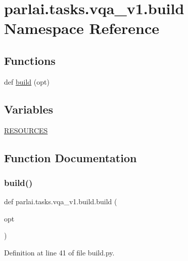 \hypertarget{namespaceparlai_1_1tasks_1_1vqa__v1_1_1build}{}\section{parlai.\+tasks.\+vqa\+\_\+v1.\+build Namespace Reference}
\label{namespaceparlai_1_1tasks_1_1vqa__v1_1_1build}
\subsection*{Functions}
\begin{DoxyCompactItemize}
\item 
def \hyperlink{namespaceparlai_1_1tasks_1_1vqa__v1_1_1build_a183cd229fa87a5dacae8b5424819df18}{build} (opt)
\end{DoxyCompactItemize}
\subsection*{Variables}
\begin{DoxyCompactItemize}
\item 
\hyperlink{namespaceparlai_1_1tasks_1_1vqa__v1_1_1build_afbcd8a400d98f5eee70f1aec3f74f54b}{R\+E\+S\+O\+U\+R\+C\+ES}
\end{DoxyCompactItemize}


\subsection{Function Documentation}
\mbox{\label{namespaceparlai_1_1tasks_1_1vqa__v1_1_1build_a183cd229fa87a5dacae8b5424819df18}} 
\subsubsection{\texorpdfstring{build()}{build()}}
{\footnotesize\ttfamily def parlai.\+tasks.\+vqa\+\_\+v1.\+build.\+build (\begin{DoxyParamCaption}\item[{}]{opt }\end{DoxyParamCaption})}



Definition at line 41 of file build.\+py.


